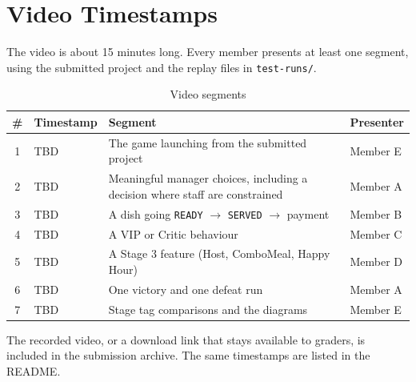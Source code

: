 \section{Video Timestamps}
\label{sec:video}

The video is about 15 minutes long. Every member presents at least one segment, using the submitted project and the replay files in \texttt{test-runs/}.

\begin{table}[H]
\centering
\begin{tabularx}{\textwidth}{clXl}
\toprule
\textbf{\#} & \textbf{Timestamp} & \textbf{Segment} & \textbf{Presenter} \\
\midrule
1 & TBD & The game launching from the submitted project & Member E \\
2 & TBD & Meaningful manager choices, including a decision where staff are constrained & Member A \\
3 & TBD & A dish going \texttt{READY} $\rightarrow$ \texttt{SERVED} $\rightarrow$ payment & Member B \\
4 & TBD & A VIP or Critic behaviour & Member C \\
5 & TBD & A Stage 3 feature (Host, ComboMeal, Happy Hour) & Member D \\
6 & TBD & One victory and one defeat run & Member A \\
7 & TBD & Stage tag comparisons and the diagrams & Member E \\
\bottomrule
\end{tabularx}
\caption{Video segments}
\end{table}

The recorded video, or a download link that stays available to graders, is included in the submission archive. The same timestamps are listed in the README.
